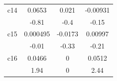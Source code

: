 \begin{table}[H]
\begin{tabular}{cccc}
    \multicolumn{1}{p{6.93em}}{c14} & 0.0653                                & 0.021                               & -0.00931                             \\
                                    & -0.81                                 & -0.4                                & -0.15                                \\
    \multicolumn{1}{p{6.93em}}{c15} & 0.000495                              & -0.0173                             & 0.00997                              \\
                                    & -0.01                                 & -0.33                               & -0.21                                \\
    \multicolumn{1}{p{6.93em}}{c16} & 0.0466                                & 0                                   & 0.0512                               \\
                                    & 1.94                                  & 0                                   & 2.44                                 \\
    \bottomrule
  \end{tabular}%
  \label{Table 2.7}%
\end{table}%

